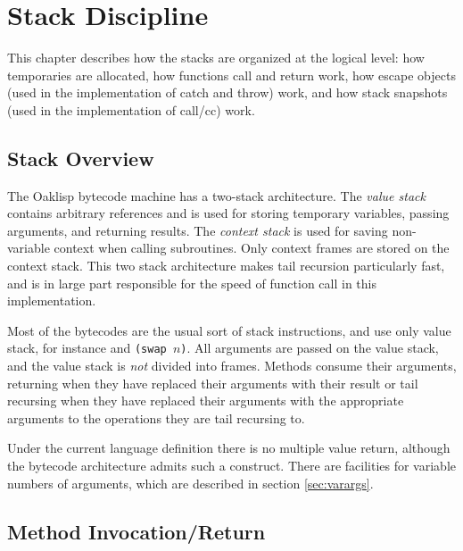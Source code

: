 \chapter{Stack Discipline}

This chapter describes how the stacks are organized at the logical
level: how temporaries are allocated, how functions call and return
work, how escape objects (used in the implementation of catch and
throw) work, and how stack snapshots (used in the implementation of
call/cc) work.

\section{Stack Overview}

The Oaklisp bytecode machine has a two-stack architecture.  The 
\emph{value stack} contains arbitrary references and is used for storing
temporary variables, passing arguments, and returning results.  The
\emph{context stack} is used for saving non-variable context when
calling subroutines.  Only context frames are stored on the context
stack.  This two stack architecture makes tail recursion particularly
fast, and is in large part responsible for the speed of function call
in this implementation.

Most of the bytecodes are the usual sort of stack instructions, and
use only value stack, for instance  and \texttt{(swap
$n$)}.  All arguments are passed on the value stack,
and the value stack is \emph{not} divided into frames.  Methods consume
their arguments, returning when they have replaced their arguments
with their result or tail recursing when they have replaced their
arguments with the appropriate arguments to the operations they are
tail recursing to.

Under the current language definition there is no multiple value
return, although the bytecode architecture admits such a construct.
There are facilities for variable numbers of arguments, which are
described in section \ref{sec:varargs}.


\newenvironment{stackphoto}{\begin{center}\begin{tabular}{|c|}
$\vdots$\\\hline}{\end{tabular}\end{center}}

\section{Method Invocation/Return}

